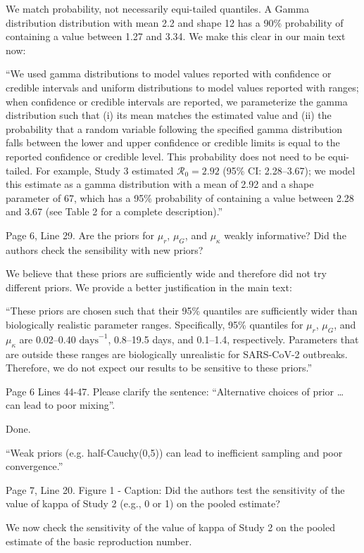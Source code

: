 \documentclass[12pt]{article}
\newcommand{\Ro}{\ensuremath{{\mathcal R}_{0}}\xspace}
\newcommand{\revtext}{\textsf}
\begin{document}
We match probability, not necessarily equi-tailed quantiles. A Gamma distribution distribution with mean
2.2 and shape 12 has a 90\% probability of containing a value between 1.27 and 3.34. We make this clear in our main text now:

``We used gamma distributions to model values reported with confidence or credible intervals and uniform distributions to model values reported with ranges;
when confidence or credible intervals are reported, we parameterize the gamma distribution such that (i) its mean matches the estimated value and (ii) the probability that a random variable following the specified gamma distribution falls between the lower and upper confidence or credible limits is equal to the reported confidence or credible level. 
This probability does not need to be equi-tailed.
For example, Study 3 estimated $\Ro = 2.92$ (95\% CI: 2.28--3.67);
we model this estimate as a gamma distribution with a mean of 2.92 and a shape parameter of 67, which has a 95\% probability of containing a value between 2.28 and 3.67 (see Table 2 for a complete description).''

\revtext{Page 6, Line 29. Are the priors for $\mu_r$, $\mu_G$, and $\mu_\kappa$ weakly informative? Did the
authors check the sensibility with new priors?}

We believe that these priors are sufficiently wide and therefore did not try different priors. We provide a better justification in the main text:

``These priors are chosen such that their 95\% quantiles are sufficiently wider than biologically realistic parameter ranges.
Specifically, 95\% quantiles for $\mu_r$, $\mu_G$, and $\mu_\kappa$ are 0.02--0.40 $\mathrm{days}^{-1}$, 0.8--19.5 days, and 0.1--1.4, respectively.
Parameters that are outside these ranges are biologically unrealistic for SARS-CoV-2 outbreaks.
Therefore, we do not expect our results to be sensitive to these priors.''

\revtext{Page 6 Lines 44-47. Please clarify the sentence: “Alternative choices of prior … can lead to
poor mixing”.}

Done.

``Weak priors (e.g. half-Cauchy(0,5)) can lead to inefficient sampling and poor convergence.''

\revtext{Page 7, Line 20. Figure 1 - Caption: Did the authors test the sensitivity of the value of kappa of
Study 2 (e.g., 0 or 1) on the pooled estimate?}

We now check the sensitivity of the value of kappa of Study 2 on the pooled estimate of the basic reproduction number.
\end{document}
